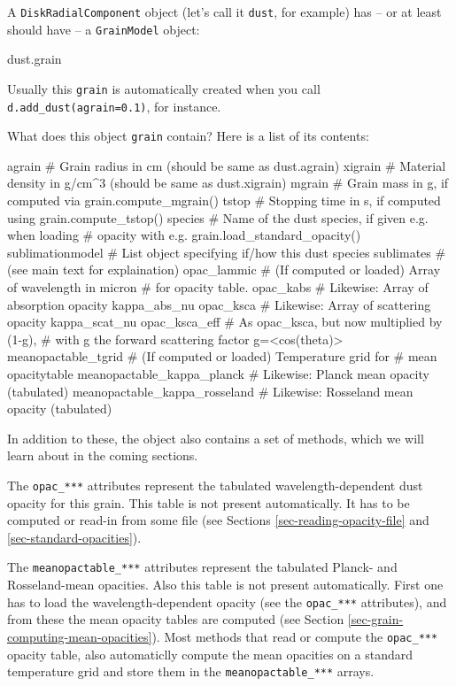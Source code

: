 \documentclass{book}
\newcommand{\code}[1]{{\small\tt #1}}
\begin{document}
A \code{DiskRadialComponent} object (let's call it \code{dust}, for example) has -- or at
least should have -- a \code{GrainModel} object:
\begin{codebox}
dust.grain
\end{codebox}
Usually this \code{grain} is automatically created when you call
\code{d.add\_dust(agrain=0.1)}, for instance.

What does this object \code{grain} contain? Here is a list of its contents:
\begin{codebox}
agrain                 # Grain radius in cm (should be same as dust.agrain)
xigrain                # Material density in g/cm^3 (should be same as dust.xigrain)
mgrain                 # Grain mass in g, if computed via grain.compute_mgrain()
tstop                  # Stopping time in s, if computed using grain.compute_tstop()
species                # Name of the dust species, if given e.g. when loading
                       # opacity with e.g. grain.load_standard_opacity()
sublimationmodel       # List object specifying if/how this dust species sublimates
                       # (see main text for explaination)
opac_lammic            # (If computed or loaded) Array of wavelength in micron
                       # for opacity table.
opac_kabs              # Likewise: Array of absorption opacity kappa_abs_nu
opac_ksca              # Likewise: Array of scattering opacity kappa_scat_nu
opac_ksca_eff          # As opac_ksca, but now multiplied by (1-g),
                       # with g the forward scattering factor g=<cos(theta)>
meanopactable_tgrid            # (If computed or loaded) Temperature grid for
                               # mean opacitytable
meanopactable_kappa_planck     # Likewise: Planck mean opacity (tabulated)
meanopactable_kappa_rosseland  # Likewise: Rosseland mean opacity (tabulated)
\end{codebox}
In addition to these, the object also contains a set of methods, which we
will learn about in the coming sections.

The \code{opac\_***} attributes represent the tabulated wavelength-dependent
dust opacity for this grain. This table is not present automatically. It has to
be computed or read-in from some file (see Sections \ref{sec-reading-opacity-file}
and \ref{sec-standard-opacities}).

The \code{meanopactable\_***} attributes represent the tabulated Planck- and
Rosseland-mean opacities. Also this table is not present automatically. First
one has to load the wavelength-dependent opacity (see the \code{opac\_***}
attributes), and from these the mean opacity tables are computed (see
Section \ref{sec-grain-computing-mean-opacities}). Most methods
that read or compute the \code{opac\_***} opacity table, also automaticlly
compute the mean opacities on a standard temperature grid and store them
in the \code{meanopactable\_***} arrays.
\end{document}
